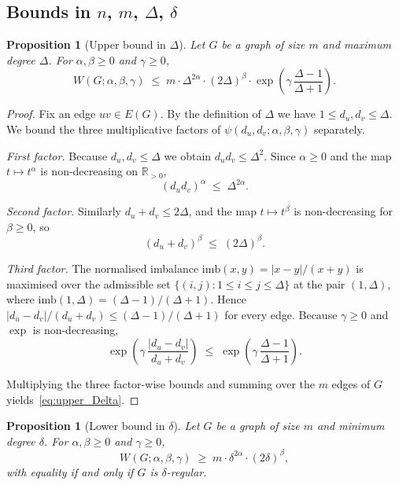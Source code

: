 \documentclass[a5paper, 10pt]{article}
\theoremstyle{plain}
\newtheorem{proposition}[theorem]{Proposition}
\theoremstyle{remark}
\theoremstyle{definition}
\newcommand{\Wuzi}{W(G;\alpha,\beta,\gamma)}
\begin{document}
\subsection{Bounds in \texorpdfstring{$n$, $m$, $\Delta$, $\delta$}{n, m, Delta, delta}}\label{sub:nmDelta}

\begin{proposition}[Upper bound in $\Delta$]\label{thm:upper_Delta}
Let $G$ be a graph of size $m$ and maximum degree $\Delta$. For
$\alpha, \beta \ge 0$ and $\gamma \ge 0$,
\begin{equation}\label{eq:upper_Delta}
\Wuzi \;\le\; m \cdot \Delta^{2\alpha} \cdot (2\Delta)^{\beta}
\cdot \exp\!\left(\gamma\,\frac{\Delta - 1}{\Delta + 1}\right).
\end{equation}
\end{proposition}

\begin{proof}
Fix an edge $uv \in E(G)$. By the definition of $\Delta$ we have
$1 \le d_u, d_v \le \Delta$. We bound the three multiplicative
factors of $\psi(d_u, d_v; \alpha, \beta, \gamma)$ separately.

\emph{First factor.} Because $d_u, d_v \le \Delta$ we obtain
$d_u d_v \le \Delta^{2}$. Since $\alpha \ge 0$ and the map
$t \mapsto t^{\alpha}$ is non-decreasing on $\mathbb{R}_{> 0}$,
\[
(d_u d_v)^{\alpha} \;\le\; \Delta^{2\alpha}.
\]

\emph{Second factor.} Similarly $d_u + d_v \le 2\Delta$, and the
map $t \mapsto t^{\beta}$ is non-decreasing for $\beta \ge 0$, so
\[
(d_u + d_v)^{\beta} \;\le\; (2\Delta)^{\beta}.
\]

\emph{Third factor.} The normalised imbalance
$\mathrm{imb}(x, y) = |x - y|/(x + y)$ is maximised over the
admissible set $\{(i, j) : 1 \le i \le j \le \Delta\}$ at the
pair $(1, \Delta)$, where
$\mathrm{imb}(1, \Delta) = (\Delta - 1)/(\Delta + 1)$. Hence
$|d_u - d_v|/(d_u + d_v) \le (\Delta - 1)/(\Delta + 1)$ for every
edge. Because $\gamma \ge 0$ and $\exp$ is non-decreasing,
\[
\exp\!\left(\gamma\,\frac{|d_u - d_v|}{d_u + d_v}\right)
\;\le\;
\exp\!\left(\gamma\,\frac{\Delta - 1}{\Delta + 1}\right).
\]

Multiplying the three factor-wise bounds and summing over the
$m$ edges of $G$ yields~\eqref{eq:upper_Delta}.
\end{proof}

\begin{proposition}[Lower bound in $\delta$]\label{thm:lower_delta}
Let $G$ be a graph of size $m$ and minimum degree $\delta$. For
$\alpha, \beta \ge 0$ and $\gamma \ge 0$,
\begin{equation}\label{eq:lower_delta}
\Wuzi \;\ge\; m \cdot \delta^{2\alpha} \cdot (2\delta)^{\beta},
\end{equation}
with equality if and only if $G$ is $\delta$-regular.
\end{proposition}
\end{document}
